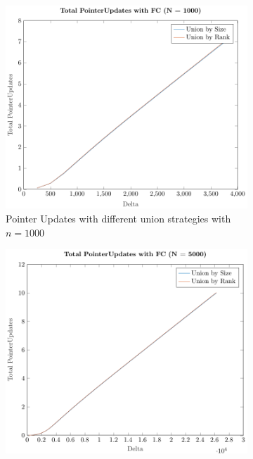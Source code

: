 \begin{figure}[ht]
    \centering
    \begin{subfigure}{0.32\textwidth}
        \centering
        \includegraphics[width=\textwidth]{../images/plotFCNonFull1000_PointerUpdates.pdf}
        \caption{Pointer Updates with different union strategies with $n = 1000$}
    \end{subfigure}%
    \hfill
    \begin{subfigure}{0.32\textwidth}
        \centering
        \includegraphics[width=\textwidth]{../images/plotFCNonFull5000_PointerUpdates.pdf}

\end{subfigure}
\end{figure}
